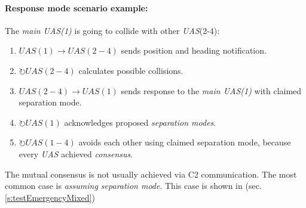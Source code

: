 \paragraph{Response mode scenario example:} The \emph{main UAS(1)} is going to collide with other \emph{UAS}(2-4):
\begin{enumerate}
    \item $UAS(1) \to UAS(2-4)$ sends position and heading notification.
    \item $\circlearrowright UAS(2-4)$ calculates possible collisions.
    \item $UAS(2-4) \to UAS(1)$ sends response to the \emph{main UAS(1)} with claimed separation mode. 
    \item $\circlearrowright UAS(1)$ acknowledges proposed \emph{separation modes}.
    \item $\circlearrowright UAS(1-4)$ avoids each other using claimed separation mode, because every \emph{UAS} achieved \emph{consensus}.
\end{enumerate}

\begin{note}
	The mutual consensus is not usually achieved via C2 communication. The most common case is \emph{assuming separation mode}. This case is shown in (sec. \ref{s:testEmergencyMixed})
\end{note}